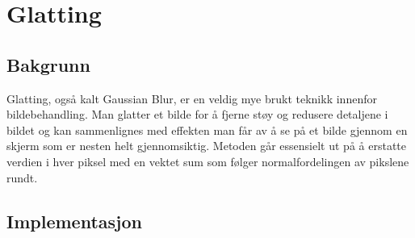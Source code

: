 \section{Glatting}
\label{sec:Glatting}
\subsection{Bakgrunn}
Glatting, også kalt Gaussian Blur\cite{wiki:blur}, er en veldig mye brukt teknikk innenfor bildebehandling. Man glatter et bilde for å fjerne støy og redusere detaljene i bildet og kan sammenlignes med effekten man får av å se på et bilde gjennom en skjerm som er nesten helt gjennomsiktig. Metoden går essensielt ut på å erstatte verdien i hver piksel med en vektet sum som følger normalfordelingen av pikslene rundt\cite{wiki:blurSV}. 

\subsection{Implementasjon}
